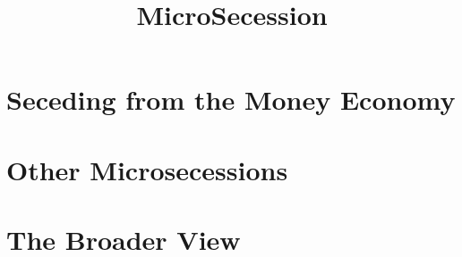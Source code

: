 \documentclass{book}
\title{MicroSecession}
\begin{document}
\frontmatter


\tableofcontents

\mainmatter



\part{Seceding from the Money Economy}





\part{Other Microsecessions}






\part{The Broader View}





\end{document}
